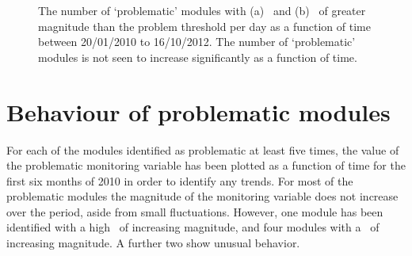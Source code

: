 \begin{figure}
	\centering
  \caption[The number of `problematic' modules with (a) \deltat\ and (b) \tdiff\
  with magnitude greater than the problem threshold per day as a function of time
  between 20/01/2010 to 16/10/2012. ]{The number of `problematic' modules with
  (a) \deltat\ and (b) \tdiff\ of greater magnitude than the problem threshold
  per day as a function of time between 20/01/2010 to 16/10/2012. The number of
  `problematic' modules is not seen to increase significantly as a function of
  time.}
	\label{fig:num_pm}
\end{figure}

\section{Behaviour of problematic modules}

For each of the modules identified as problematic at least five times, the value of the problematic monitoring
variable has been plotted as a function of time for the first six months of 2010
in order to identify any trends. For most of the
problematic modules the magnitude of the monitoring variable does not increase
over the period, aside from small fluctuations.  However, one module has been
identified with a high \deltat\ of increasing magnitude, and four modules with a
\tdiff\ of increasing magnitude. A further two show unusual behavior. 

